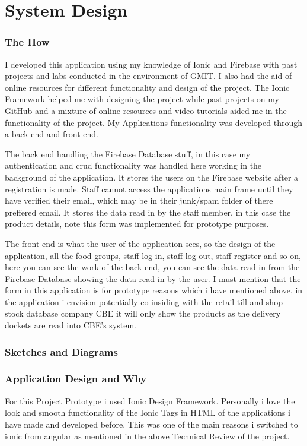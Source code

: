 \chapter{System Design}

\subsection{The How}
I developed this application using my knowledge of Ionic and Firebase with past projects and labs conducted in the environment of GMIT. I also had the aid of online resources for different functionality and design of the project. The Ionic Framework helped me with designing the project while past projects on my GitHub and a mixture of online resources and video tutorials aided me in the functionality of the project. My Applications functionality was developed through a back end and front end. 
\newline

The back end handling the Firebase Database stuff, in this case my authentication and crud functionality was handled here working in the background of the application. It stores the users on the Firebase website after a registration is made. Staff cannot access the applications main frame until they have verified their email, which may be in their junk/spam folder of there preffered email. It stores the data read in by the staff member, in this case the product details, note this form was implemented for prototype purposes.
\newline 

The front end is what the user of the application sees, so the design of the application, all the food groups, staff log in, staff log out, staff register and so on, here you can see the work of the back end, you can see the data read in from the Firebase Database showing the data read in by the user. I must mention that the form in this application is for prototype reasons which i have mentioned above, in the application i envision potentially co-insiding with the retail till and shop stock database company CBE it will only show the products as the delivery dockets are read into CBE's system. 

\subsection{Sketches and Diagrams}

\subsection{Application Design and Why}
For this Project Prototype i used Ionic Design Framework. Personally i love the look and smooth functionality of the Ionic Tags in HTML of the applications i have made and developed before. This was one of the main reasons i switched to ionic from angular as mentioned in the above Technical Review of the project. 
\newline


